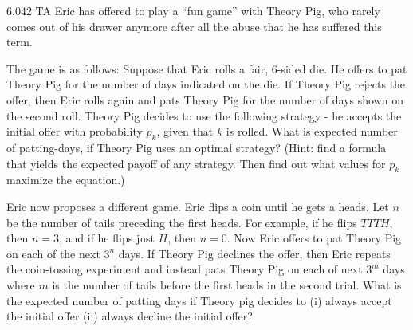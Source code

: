 \documentclass[11pt,twoside]{article}
\begin{document}
\begin{problem}6.042 TA Eric has offered to play a
``fun game'' with Theory Pig, who rarely comes out of his drawer
anymore after all the abuse that he has suffered this term.

\begin{problemparts}
\problempart The game is as follows: Suppose that Eric rolls a fair,
6-sided die.  He offers to pat Theory Pig for the number of days
indicated on the die. If Theory Pig rejects the offer, then Eric rolls
again and pats Theory Pig for the number of days shown on the second
roll. Theory Pig decides to use the following strategy - he accepts
the initial offer with probability $p_k$, given that $k$ is rolled.
What is expected number of patting-days, if Theory Pig uses an optimal
strategy? (Hint: find a formula that yields the expected payoff of any
strategy. Then find out what values for $p_k$ maximize the equation.)


\problempart Eric now proposes a different game. Eric flips a coin
until he gets a heads.  Let $n$ be the number of tails preceding the
first heads.  For example, if he flips $TTTH$, then $n = 3$, and if he
flips just $H$, then $n = 0$.  Now Eric offers to pat Theory Pig on
each of the next $3^n$ days.  If Theory Pig declines the offer, then
Eric repeats the coin-tossing experiment and instead pats Theory Pig
on each of next $3^m$ days where $m$ is the number of tails before the
first heads in the second trial. What is the expected number of
patting days if Theory pig decides to (i) always accept the initial
offer (ii) always decline the initial offer?


\end{problemparts}
\end{problem}
\end{document}
